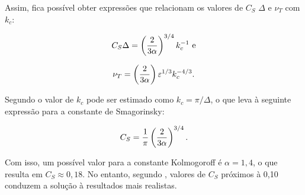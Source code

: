 \noindent Assim, fica possível obter expressões que relacionam os valores de $C_S$ $\Delta$ e $\nu_T$ com $k_c$:

\begin{equation}
    C_S\Delta=\left({\frac{2}{3\alpha}}\right)^{3/4}k_c^{-1}\text{ e}
\end{equation}

\begin{equation}
    \nu_T=\left({\frac{2}{3\alpha}}\right)\varepsilon^{1/3}k_c^{-4/3}\text{.}
\end{equation}

Segundo  o valor de $k_c$ pode ser estimado como $k_c=\pi/\Delta$, o que leva à seguinte expressão para a constante de Smagorinsky:

\begin{equation}
    C_S=\frac{1}{\pi}\left({\frac{2}{3\alpha}}\right)^{3/4}\text{.}
\end{equation}

Com isso, um possível valor para a constante Kolmogoroff é $\alpha=1,4$, o que resulta em $C_S\approx0,18$. No entanto, segundo  , valores de $C_S$ próximos à 0,10 conduzem a solução à resultados mais realistas.

